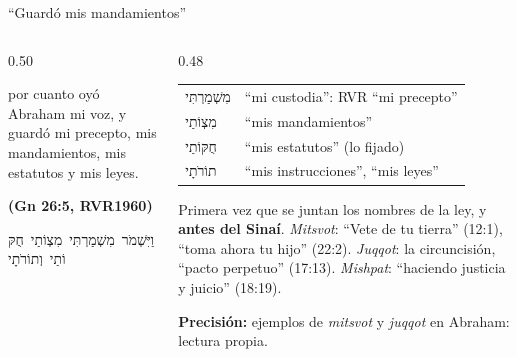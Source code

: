 \documentclass[hyperref={bookmarks=false},aspectratio=169]{beamer}
\newcommand{\heb}[1]{\mbox{\foreignlanguage{hebrew}{#1}}}
\newcommand{\fuente}[1]{\par\hfill{\upshape\bfseries\footnotesize\textcolor{azul}{#1}}}
\newcommand{\destacar}[1]{\textbf{\textcolor{azul}{#1}}}
\newcommand{\precision}[1]{{\footnotesize\color{gris}\textbf{Precisión:} #1}}
\begin{document}
\begin{frame}{``Guardó mis mandamientos''}
\begin{columns}[c,onlytextwidth]
\begin{column}{0.50\textwidth}
\begin{cita}por cuanto oyó Abraham mi voz, y guardó mi precepto, mis mandamientos, mis estatutos y mis leyes.\fuente{(Gn 26:5, RVR1960)}\end{cita}
\begin{center}\small\heb{וַיִּשְׁמֹר מִשְׁמַרְתִּי מִצְוֹתַי חֻקּוֹתַי וְתוֹרֹתָי}\end{center}
\end{column}
\begin{column}{0.48\textwidth}
\scriptsize\renewcommand{\arraystretch}{1.12}
\begin{tabular}{@{}>{\RaggedRight\arraybackslash}p{1.8cm}>{\RaggedRight\arraybackslash}p{3.5cm}@{}}
\toprule
\heb{מִשְׁמַרְתִּי} & ``mi custodia'': RVR ``mi precepto'' \\
\heb{מִצְוֹתַי} & ``mis mandamientos'' \\
\heb{חֻקּוֹתַי} & ``mis estatutos'' (lo fijado) \\
\heb{תוֹרֹתָי} & ``mis instrucciones'', ``mis leyes'' \\
\bottomrule
\end{tabular}\par\smallskip
\scriptsize Primera vez que se juntan los nombres de la ley, y \destacar{antes del Sinaí}. \emph{Mitsvot}: ``Vete de tu tierra'' (12:1), ``toma ahora tu hijo'' (22:2). \emph{Juqqot}: la circuncisión, ``pacto perpetuo'' (17:13). \emph{Mishpat}: ``haciendo justicia y juicio'' (18:19).\par\precision{ejemplos de \emph{mitsvot} y \emph{juqqot} en Abraham: lectura propia.}
\end{column}
\end{columns}
\end{frame}
\end{document}
